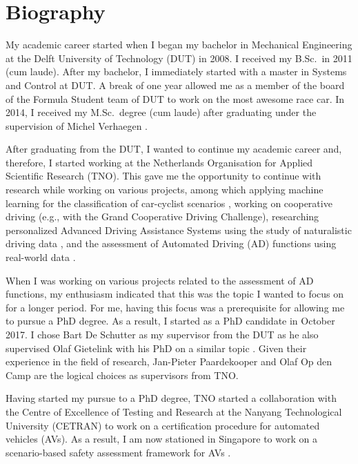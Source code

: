 \section{Biography}
\label{sec:bio}

My academic career started when I began my bachelor in Mechanical Engineering at the Delft University of Technology (DUT) in 2008. I received my B.Sc.\ in 2011 (cum laude). After my bachelor, I immediately started with a master in Systems and Control at DUT. A break of one year allowed me as a member of the board of the Formula Student team of DUT to work on the most awesome race car. In 2014, I received my M.Sc.\ degree (cum laude) after graduating under the supervision of Michel Verhaegen \cite{deGelder2015sabre}.

After graduating from the DUT, I wanted to continue my academic career and, therefore, I started working at the Netherlands Organisation for Applied Scientific Research (TNO). This gave me the opportunity to continue with research while working on various projects, among which applying machine learning for the classification of car-cyclist scenarios \cite{cara2015carcyclist}, working on cooperative driving (e.g., with the Grand Cooperative Driving Challenge), researching personalized Advanced Driving Assistance Systems using the study of naturalistic driving data \cite{gelder2016pacc}, and the assessment of Automated Driving (AD) functions using real-world data \cite{deGelder2017assessment}.

When I was working on various projects related to the assessment of AD functions, my enthusiasm indicated that this was the topic I wanted to focus on for a longer period. For me, having this focus was a prerequisite for allowing me to pursue a PhD degree. As a result, I started as a PhD candidate in October 2017. I chose Bart De Schutter as my supervisor from the DUT as he also supervised Olaf Gietelink with his PhD on a similar topic \cite{gietelink2007phd}. Given their experience in the field of research, Jan-Pieter Paardekooper and Olaf Op den Camp are the logical choices as supervisors from TNO.

Having started my pursue to a PhD degree, TNO started a collaboration with the Centre of Excellence of Testing and Research at the Nanyang Technological University (CETRAN) to work on a certification procedure for automated vehicles (AVs). As a result, I am now stationed in Singapore to work on a scenario-based safety assessment framework for AVs \cite{ploeg2018cetran}.
